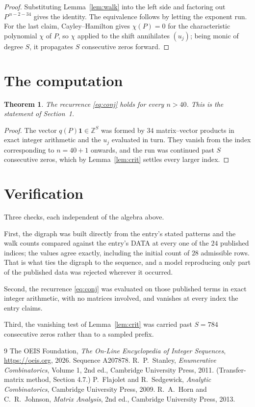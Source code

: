 \documentclass[11pt,a4paper]{article}
\theoremstyle{plain}
\newtheorem{theorem}{Theorem}
\theoremstyle{definition}
\begin{document}
\begin{proof}
Substituting Lemma~\ref{lem:walk} into the left side and factoring out
$P^{\,n-2-34}$ gives the identity. The equivalence follows by letting the exponent
run. For the last claim, Cayley--Hamilton gives $\chi(P)=0$ for the characteristic
polynomial $\chi$ of $P$, so $\chi$ applied to the shift annihilates $(u_j)$; being monic of
degree $S$, it propagates $S$ consecutive zeros forward.
\end{proof}

\section{The computation}

\begin{theorem}
The recurrence \eqref{eq:conj} holds for every $n>40$. This is the statement of
Section~1.
\end{theorem}

\begin{proof}
The vector $q(P)\mathbf{1}\in\mathbb{Z}^{S}$ was formed by $34$ matrix--vector
products in exact integer arithmetic and the $u_j$ evaluated in turn. They vanish from the
index corresponding to $n=40+1$ onwards, and the run was continued past $S$ consecutive
zeros, which by Lemma~\ref{lem:crit} settles every larger index.
\end{proof}

\section{Verification}

Three checks, each independent of the algebra above.

First, the digraph was built directly from the entry's stated patterns and the walk counts
compared against the entry's DATA at every one of the $24$ published indices; the
values agree exactly, including the initial count of $28$ admissible rows. That is
what ties the digraph to the sequence, and a model reproducing only part of the published
data was rejected wherever it occurred.

Second, the recurrence \eqref{eq:conj} was evaluated on those published terms in exact
integer arithmetic, with no matrices involved, and vanishes at every index the entry claims.

Third, the vanishing test of Lemma~\ref{lem:crit} was carried past $S=784$ consecutive
zeros rather than to a sampled prefix.

\begin{thebibliography}{9}
 The OEIS Foundation, \emph{The On-Line Encyclopedia of Integer
Sequences}, \url{https://oeis.org}, 2026. Sequence A207878.
 R.~P.~Stanley, \emph{Enumerative Combinatorics}, Volume 1, 2nd ed.,
Cambridge University Press, 2011. (Transfer-matrix method, Section 4.7.)
 P.~Flajolet and R.~Sedgewick, \emph{Analytic Combinatorics}, Cambridge
University Press, 2009.
 R.~A.~Horn and C.~R.~Johnson, \emph{Matrix Analysis}, 2nd ed., Cambridge
University Press, 2013.
\end{thebibliography}
\end{document}
